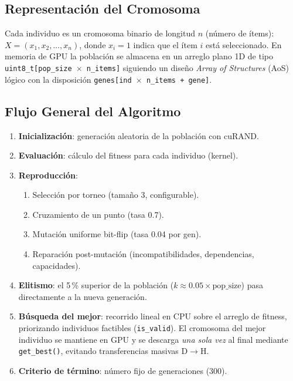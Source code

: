 \subsection{Representación del Cromosoma}

Cada individuo es un cromosoma binario de longitud $n$ (número de ítems):
$X = (x_1, x_2, \ldots, x_n)$, donde $x_i = 1$ indica que el ítem $i$ está
seleccionado. En memoria de GPU la población se almacena en un arreglo plano 1D
de tipo \texttt{uint8\_t[pop\_size $\times$ n\_items]} siguiendo un diseño \emph{Array of Structures} (AoS) lógico con la disposición \texttt{genes[ind $\times$ n\_items + gene]}.


\subsection{Flujo General del Algoritmo}

\begin{enumerate}
  \item \textbf{Inicialización}: generación aleatoria de la población con cuRAND.
  \item \textbf{Evaluación}: cálculo del fitness para cada individuo (kernel).
  \item \textbf{Reproducción}:
    \begin{enumerate}[label=\alph*.]
      \item Selección por torneo (tamaño 3, configurable).
      \item Cruzamiento de un punto (tasa 0.7).
      \item Mutación uniforme bit-flip (tasa 0.04 por gen).
      \item Reparación post-mutación (incompatibilidades, dependencias, capacidades).
    \end{enumerate}
  \item \textbf{Elitismo}: el 5\,\% superior de la población ($k \approx 0.05 \times \text{pop\_size}$) pasa directamente a la nueva generación.
  \item \textbf{Búsqueda del mejor}: recorrido lineal en CPU sobre el arreglo de
    fitness, priorizando individuos factibles (\texttt{is\_valid}). El cromosoma del
    mejor individuo se mantiene en GPU y se descarga \emph{una sola vez} al final
    mediante \texttt{get\_best()}, evitando transferencias masivas D$\to$H.
  \item \textbf{Criterio de término}: número fijo de generaciones (300).
\end{enumerate}

